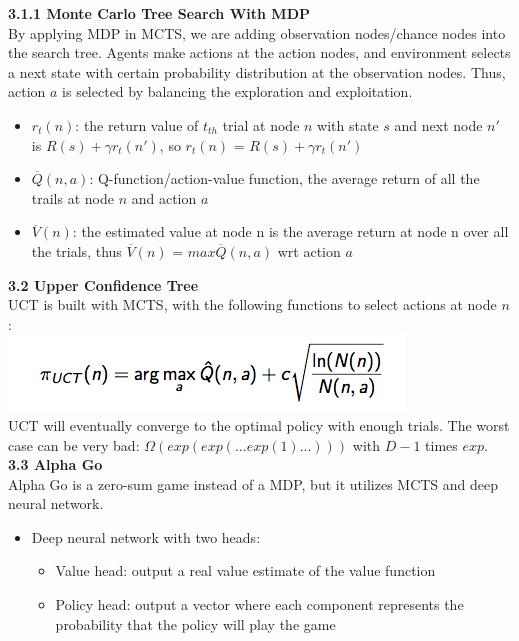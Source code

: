 \documentclass[12pt]{article}
\begin{document}
\noindent
\textbf{3.1.1 Monte Carlo Tree Search With MDP}\\
By applying MDP in MCTS, we are adding observation nodes/chance nodes into the search tree. Agents make actions at the action nodes, and environment selects a next state with certain probability distribution at the observation nodes. Thus, action $a$ is selected by balancing the exploration and exploitation. 
\begin{tcolorbox}
\begin{itemize}
\item $r_t(n)$: the return value of $t_{th}$ trial at node $n$ with state $s$ and next node $n'$ is $R(s) + \gamma r_t(n')$, so $r_t(n)$ = $R(s) + \gamma r_t(n')$
\item $\overline Q(n, a)$: Q-function/action-value function, the average return of all the trails at node $n$ and action $a$
\item $\overline V(n)$: the estimated value at node n is the average return at node n over all the trials, thus $\overline V(n)$ = $max \overline Q(n, a)$ wrt action $a$
\end{itemize}
\end{tcolorbox}

\noindent
\textbf{3.2 Upper Confidence Tree}\\
UCT is built with MCTS, with the following functions to select actions at node $n$:\\
\includegraphics[scale=0.7]{UCT}\\
UCT will eventually converge to the optimal policy with enough trials. The worst case can be very bad: $\Omega(exp(exp( ... exp(1) ...)))$ with $D-1$ times $exp$.\\

\noindent
\textbf{3.3 Alpha Go}\\
Alpha Go is a zero-sum game instead of a MDP, but it utilizes MCTS and deep neural network.
\begin{tcolorbox}
\begin{itemize}
\item Deep neural network with two heads: 
\begin{itemize}
\item Value head: output a real value estimate of the value function
\item Policy head: output a vector where each component represents the probability that the policy will play the game
\end{itemize}
\end{itemize}
\end{tcolorbox}
\end{document}
